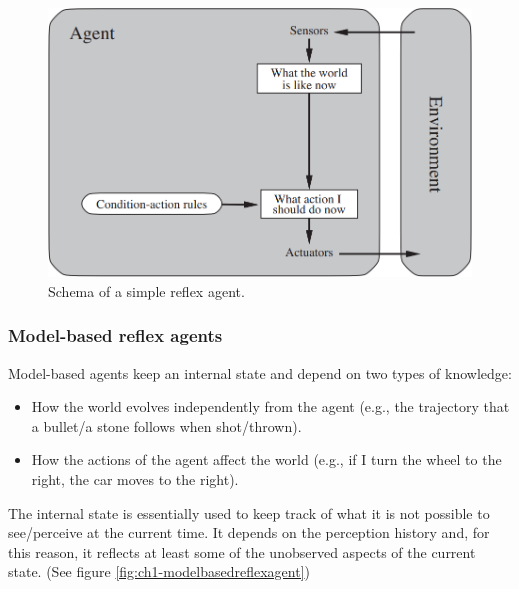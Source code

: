 \begin{figure}[hbt]
    \centering
    \includegraphics[scale=0.35]{Images/Chapter 1/simple-reflex-agents.png}
    \caption{Schema of a simple reflex agent.}
    \label{fig:ch1-simplereflexagent}
\end{figure}

\subsubsection{Model-based reflex agents}
Model-based agents keep an internal state and depend on two types of knowledge:

\begin{itemize}
    \item How the world evolves independently from the agent (e.g., the trajectory that a bullet/a stone follows when shot/thrown).
    \item How the actions of the agent affect the world (e.g., if I turn the wheel to the right, the car moves to the right).
\end{itemize}

The internal state is essentially used to keep track of what it is not possible to see/perceive at the current time. It depends on the perception history and, for this reason, it reflects at least some of the unobserved aspects of the current state. (See figure \ref{fig:ch1-modelbasedreflexagent})


